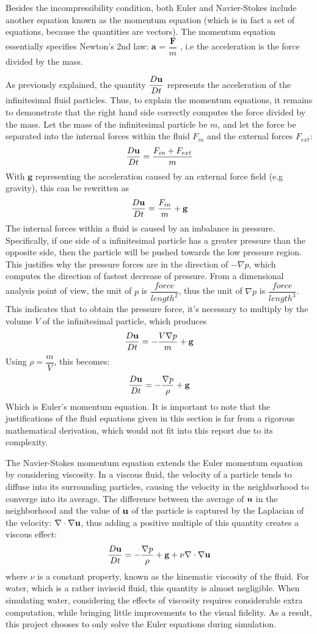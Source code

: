 Besides the incompressibility condition, both Euler and Navier-Stokes include another equation known as the momentum equation (which is in fact a set of equations, because the quantities are vectors). The momentum equation essentially specifies Newton's 2nd law: $\textbf{a}$ = $\dfrac{\textbf{F}}{m}$ , i.e the acceleration is the force divided by the mass.

As previously explained, the quantity $\dfrac{D\textbf{u}}{Dt}$ represents the acceleration of the infinitesimal fluid particles. Thus, to explain the momentum equations, it remains to demonstrate that the right hand side correctly computes the force divided by the mass. Let the mass of the infinitesimal particle be $m$, and let the force be separated into the internal forces within the fluid $F_{in}$ and the external forces $F_{ext}$:
$$
\dfrac{D\textbf{u}}{Dt} = \frac{F_{in} + F_{ext}}{m}
$$
With $\textbf{g}$ representing the acceleration caused by an external force field (e.g gravity), this can be rewritten as
$$
\dfrac{D\textbf{u}}{Dt} = \frac{F_{in}}{m} + \textbf{g}
$$
The internal forces within a fluid is caused by an imbalance in pressure. Specifically, if one side of a infinitesimal particle has a greater pressure than the opposite side, then the particle will be pushed towards the low pressure region. This justifies why the pressure forces are in the direction of $-\nabla p$, which computes the direction of fastest decrease of pressure. From a dimensional analysis point of view, the unit of $p$ is $\dfrac{force}{length^2}$, thus the unit of $\nabla p$ is $\dfrac{force}{length^3}$. This indicates that to obtain the pressure force, it's necessary to multiply by the volume $V$ of the infinitesimal particle, which produces
$$
\dfrac{D\textbf{u}}{Dt} = -\frac{V \nabla p}{m} + \textbf{g}
$$
Using $\rho = \dfrac{m}{V}$, this becomes:
$$
\dfrac{D\textbf{u}}{Dt} =  -\frac{\nabla p}{\rho} + \textbf{g}
$$
Which is Euler's momentum equation. It is important to note that the justifications of the fluid equations given in this section is far from a rigorous mathematical derivation, which would not fit into this report due to its complexity. 


The Navier-Stokes momentum equation extends the Euler momentum equation by considering viscosity. In a viscous fluid, the velocity of a particle tends to diffuse into its surrounding particles, causing the velocity in the neighborhood to converge into its average. The difference between the average of $\textbf{u}$ in the neighborhood and the value of $\textbf{u}$ of the particle is captured by the Laplacian of the velocity: $\nabla \cdot \nabla \textbf{u}$, thus adding a positive multiple of this quantity creates a viscous effect:
$$
\frac{D\textbf{u}}{Dt}   =   -\frac{\nabla p}{\rho} + \textbf{g} + \nu \nabla \cdot \nabla \textbf{u} 
$$
where $\nu$ is a constant property, known as the kinematic viscosity of the fluid. For water, which is a rather inviscid fluid, this quantity is almost negligible. When simulating water, considering the effects of viscosity requires considerable extra computation, while bringing little improvements to the visual fidelity. As a result, this project chooses to only solve the Euler equations during simulation. 


